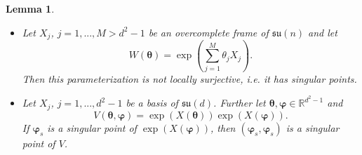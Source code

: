 \documentclass{article}
\renewcommand{\vec}[1]{\ensuremath{\boldsymbol{#1}}}
\newtheorem{lemma}{Lemma}
\begin{document}
\begin{samepage}
\begin{lemma}
\noindent
    \begin{itemize}
        \item[(a)] Let \(X_j\), \(j=1,...,M > d^2-1\) be an overcomplete frame of \(\mathfrak{su}(n)\) and let
        \begin{equation*} 
            W(\vec{\theta}) = \exp(\sum_{j=1}^M \theta_j X_j).
        \end{equation*}
        Then this parameterization is not locally surjective, i.e. it has singular points.
        \item[(b)] Let \(X_j\), \(j=1,...,d^2-1\) be a basis of \(\mathfrak{su}(d)\). Further let \(\vec{\theta}, \vec{\varphi} \in \mathds{R}^{d^2-1}\) and 
        \begin{equation*}
            V(\vec{\theta}, \vec{\varphi}) = \exp(X(\vec{\theta})) \exp(X(\vec{\varphi})).
        \end{equation*}
        If \(\vec{\varphi}_s\) is a singular point of \(\exp(X(\vec{\varphi}))\), then \((\vec{\varphi}_s, \vec{\varphi}_s)\) is a singular point of \(V\).
    \end{itemize}
\end{lemma}
\end{samepage}
\end{document}
